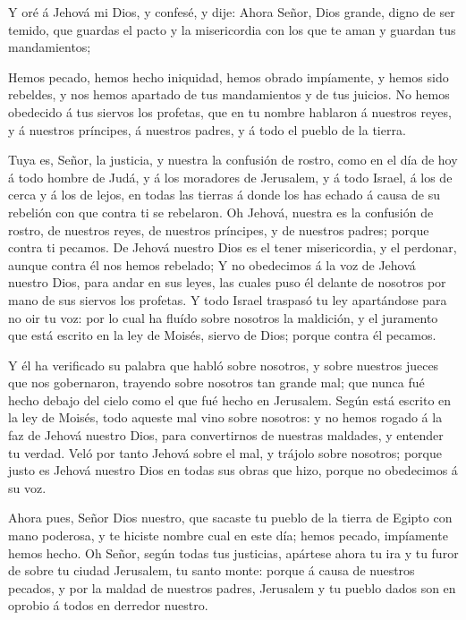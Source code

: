  Y oré á Jehová mi Dios, y confesé, y dije: Ahora Señor,
Dios grande, digno de ser temido, que guardas el pacto y la misericordia
con los que te aman y guardan tus mandamientos;

 Hemos pecado, hemos hecho iniquidad, hemos obrado
impíamente, y hemos sido rebeldes, y nos hemos apartado de tus
mandamientos y de tus juicios.  No hemos obedecido á tus
siervos los profetas, que en tu nombre hablaron á nuestros reyes, y á
nuestros príncipes, á nuestros padres, y á todo el pueblo de la tierra.

 Tuya es, Señor, la justicia, y nuestra la confusión de
rostro, como en el día de hoy á todo hombre de Judá, y á los moradores
de Jerusalem, y á todo Israel, á los de cerca y á los de lejos, en todas
las tierras á donde los has echado á causa de su rebelión con que contra
ti se rebelaron.  Oh Jehová, nuestra es la confusión de
rostro, de nuestros reyes, de nuestros príncipes, y de nuestros padres;
porque contra ti pecamos.  De Jehová nuestro Dios es el
tener misericordia, y el perdonar, aunque contra él nos hemos rebelado;
 Y no obedecimos á la voz de Jehová nuestro Dios, para
andar en sus leyes, las cuales puso él delante de nosotros por mano de
sus siervos los profetas.  Y todo Israel traspasó tu ley
apartándose para no oir tu voz: por lo cual ha fluído sobre nosotros la
maldición, y el juramento que está escrito en la ley de Moisés, siervo
de Dios; porque contra él pecamos.

 Y él ha verificado su palabra que habló sobre nosotros,
y sobre nuestros jueces que nos gobernaron, trayendo sobre nosotros tan
grande mal; que nunca fué hecho debajo del cielo como el que fué hecho
en Jerusalem.  Según está escrito en la ley de Moisés,
todo aqueste mal vino sobre nosotros: y no hemos rogado á la faz de
Jehová nuestro Dios, para convertirnos de nuestras maldades, y entender
tu verdad.  Veló por tanto Jehová sobre el mal, y trájolo
sobre nosotros; porque justo es Jehová nuestro Dios en todas sus obras
que hizo, porque no obedecimos á su voz.

 Ahora pues, Señor Dios nuestro, que sacaste tu pueblo de
la tierra de Egipto con mano poderosa, y te hiciste nombre cual en este
día; hemos pecado, impíamente hemos hecho.  Oh Señor,
según todas tus justicias, apártese ahora tu ira y tu furor de sobre tu
ciudad Jerusalem, tu santo monte: porque á causa de nuestros pecados, y
por la maldad de nuestros padres, Jerusalem y tu pueblo dados son en
oprobio á todos en derredor nuestro.

